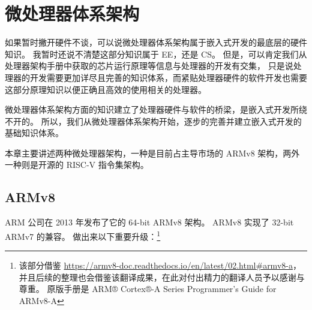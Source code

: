 \chapter{微处理器体系架构}

如果暂时撇开硬件不谈，可以说微处理器体系架构属于嵌入式开发的最底层的硬件知识。
我暂时还说不清楚这部分知识属于 EE，还是 CS。
但是，可以肯定我们从处理器架构手册中获取的芯片运行原理等信息与处理器的开发有交集，
只是说处理器的开发需要更加详尽且完善的知识体系，而紧贴处理器硬件的软件开发也需要这部分原理知识以便正确且高效的使用相关的处理器。

微处理器体系架构方面的知识建立了处理器硬件与软件的桥梁，是嵌入式开发所绕不开的。
所以，我们从微处理器体系架构开始，逐步的完善并建立嵌入式开发的基础知识体系。

本章主要讲述两种微处理器架构，一种是目前占主导市场的 ARMv8 架构，两外一种则是开源的 RISC-V 指令集架构。

\section{ARMv8}

ARM 公司在 2013 年发布了它的 64-bit ARMv8 架构。
ARMv8 实现了 32-bit ARMv7 的兼容。
做出来以下重要升级：\footnote{该部分借鉴 \url{https://armv8-doc.readthedocs.io/en/latest/02.html\#armv8-a}，并且后续的整理也会借鉴该翻译成果，在此对付出精力的翻译人员予以感谢与尊重。
原版手册是 {ARM® Cortex®-A Series Programmer’s Guide for ARMv8-A}\cite{armpg}}

